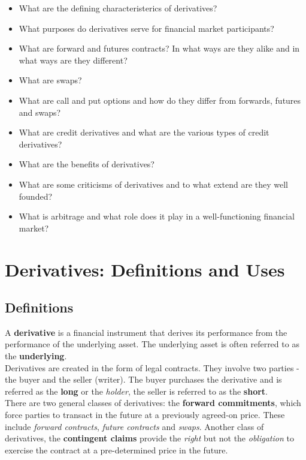\documentclass[fleqn,10pt]{SelfArx} %
\begin{document}
\newpage
\begin{itemize}
	\item What are the defining characteristerics of derivatives?
	\item What purposes do derivatives serve for financial market participants?
	\item What are forward and futures contracts? In what ways are they alike and in what ways are they different?
	\item What are swaps?
	\item What are call and put options and how do they differ from forwards, futures and swaps?
	\item What are credit derivatives and what are the various types of credit derivatives?
	\item What are the benefits of derivatives?
	\item What are some criticisms of derivatives and to what extend are they well founded?
	\item What is arbitrage and what role does it play in a well-functioning financial market?
\end{itemize}

\newpage
\section{Derivatives: Definitions and Uses}

\subsection{Definitions}

A \textbf{derivative} is a financial instrument that derives its performance from the performance of the underlying asset. The underlying asset is often referred to as the \textbf{underlying}.
\\
Derivatives are created in the form of legal contracts. They involve two parties - the buyer and the seller (writer). The buyer purchases the derivative and is referred as the \textbf{long} or the \textit{holder}, the seller is referred to as the \textbf{short}.
\\
There are two general classes of derivatives: the \textbf{forward commitments}, which force parties to transact in the future at a previously agreed-on price. These include \textit{forward contracts}, \textit{future contracts} and \textit{swaps}. Another class of derivatives, the \textbf{contingent claims} provide the \textit{right} but not the \textit{obligation} to exercise the contract at a pre-determined price in the future.
\end{document}
